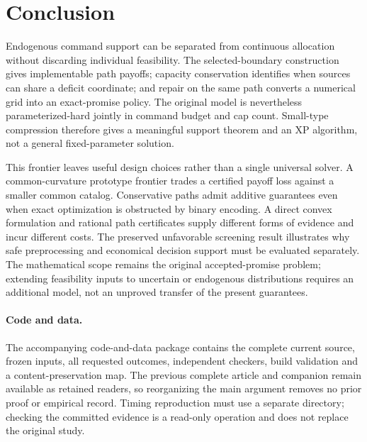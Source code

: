 \section{Conclusion}
Endogenous command support can be separated from continuous allocation without discarding individual feasibility. The selected-boundary construction gives implementable path payoffs; capacity conservation identifies when sources can share a deficit coordinate; and repair on the same path converts a numerical grid into an exact-promise policy. The original model is nevertheless parameterized-hard jointly in command budget and cap count. Small-type compression therefore gives a meaningful support theorem and an XP algorithm, not a general fixed-parameter solution.

This frontier leaves useful design choices rather than a single universal solver. A common-curvature prototype frontier trades a certified payoff loss against a smaller common catalog. Conservative paths admit additive guarantees even when exact optimization is obstructed by binary encoding. A direct convex formulation and rational path certificates supply different forms of evidence and incur different costs. The preserved unfavorable screening result illustrates why safe preprocessing and economical decision support must be evaluated separately. The mathematical scope remains the original accepted-promise problem; extending feasibility inputs to uncertain or endogenous distributions requires an additional model, not an unproved transfer of the present guarantees.

\paragraph{Code and data.}
The accompanying code-and-data package contains the complete current source, frozen inputs, all requested outcomes, independent checkers, build validation and a content-preservation map. The previous complete article and companion remain available as retained readers, so reorganizing the main argument removes no prior proof or empirical record. Timing reproduction must use a separate directory; checking the committed evidence is a read-only operation and does not replace the original study.
